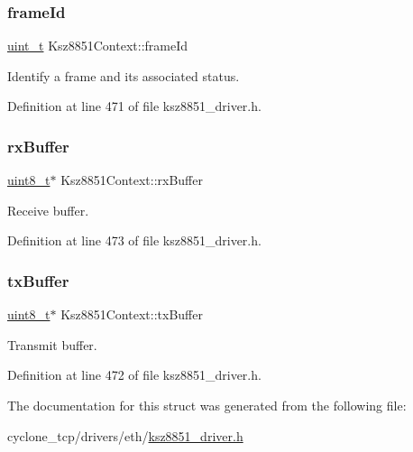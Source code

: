 \subsubsection{\texorpdfstring{frame\+Id}{frameId}}
{\footnotesize\ttfamily \hyperlink{compiler__port_8h_a12a1e9b3ce141648783a82445d02b58d}{uint\+\_\+t} Ksz8851\+Context\+::frame\+Id}



Identify a frame and its associated status. 



Definition at line 471 of file ksz8851\+\_\+driver.\+h.

\mbox{\label{structKsz8851Context_aedfff3a17d92a82fb7bd5ce91ef8d865}} 
\subsubsection{\texorpdfstring{rx\+Buffer}{rxBuffer}}
{\footnotesize\ttfamily \hyperlink{stdint_8h_aba7bc1797add20fe3efdf37ced1182c5}{uint8\+\_\+t}$\ast$ Ksz8851\+Context\+::rx\+Buffer}



Receive buffer. 



Definition at line 473 of file ksz8851\+\_\+driver.\+h.

\mbox{\label{structKsz8851Context_a9eef3244c4dcc6554dc1e8a0243491eb}} 
\subsubsection{\texorpdfstring{tx\+Buffer}{txBuffer}}
{\footnotesize\ttfamily \hyperlink{stdint_8h_aba7bc1797add20fe3efdf37ced1182c5}{uint8\+\_\+t}$\ast$ Ksz8851\+Context\+::tx\+Buffer}



Transmit buffer. 



Definition at line 472 of file ksz8851\+\_\+driver.\+h.



The documentation for this struct was generated from the following file\+:\begin{DoxyCompactItemize}
\item 
cyclone\+\_\+tcp/drivers/eth/\hyperlink{ksz8851__driver_8h}{ksz8851\+\_\+driver.\+h}\end{DoxyCompactItemize}

